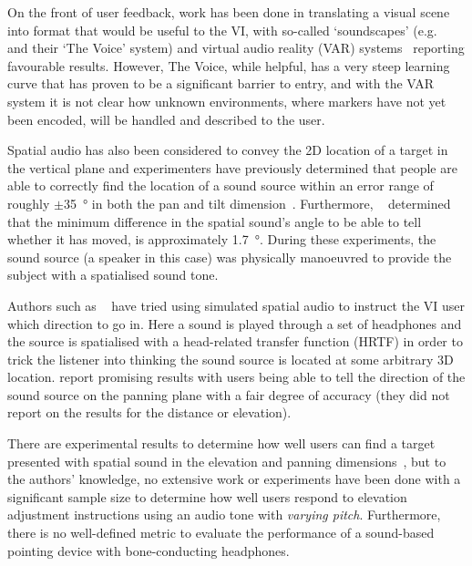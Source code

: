 \documentclass[format=sigconf, review=true, screen=true, anonymous=true]{acmart}
\begin{document}
On the front of user feedback, work has been done in translating a visual scene into format that would be useful to the VI, with so-called `soundscapes' (e.g. \citeauthor{meijer2010}~\cite{meijer2010} and their `The Voice' system) and virtual audio reality (VAR) systems~\cite{frauenberger2003} reporting favourable results. However, The Voice, while helpful, has a very steep learning curve that has proven to be a significant barrier to entry, and with the VAR system it is not clear how unknown environments, where markers have not yet been encoded, will be handled and described to the user. 

Spatial audio has also been considered to convey the 2D location of a target in the vertical plane and experimenters have previously determined that people are able to correctly find the location of a sound source within an error range of roughly $\pm$\SI{35}{\degree} in both the pan and tilt dimension~\cite{zwiers2001spatial}. Furthermore, \citeauthor{ashmead1998spatial}~\cite{ashmead1998spatial} determined that the minimum difference in the spatial sound's angle to be able to tell whether it has moved, is approximately \SI{1.7}{\degree}. During these experiments, the sound source (a speaker in this case) was physically manoeuvred to provide the subject with a spatialised sound tone. 

Authors such as \citeauthor{holland2002audiogps}~\cite{holland2002audiogps} have tried using simulated spatial audio to instruct the VI user which direction to go in. Here a sound is played through a set of headphones and the source is spatialised with a head-related transfer function (HRTF) in order to trick the listener into thinking the sound source is located at some arbitrary 3D location. \citeauthor{holland2002audiogps} report promising results with users being able to tell the direction of the sound source on the panning plane with a fair degree of accuracy (they did not report on the results for the distance or elevation). %

There are experimental results to determine how well users can find a target presented with spatial sound in the elevation and panning dimensions~\cite{katz2011spatial, zwiers2001spatial}, but to the authors' knowledge, no extensive work or experiments have been done with a significant sample size to determine how well users respond to elevation adjustment instructions using an audio tone with \emph{varying pitch}. Furthermore, there is no well-defined metric to evaluate the performance of a sound-based pointing device with bone-conducting headphones. 
\end{document}
